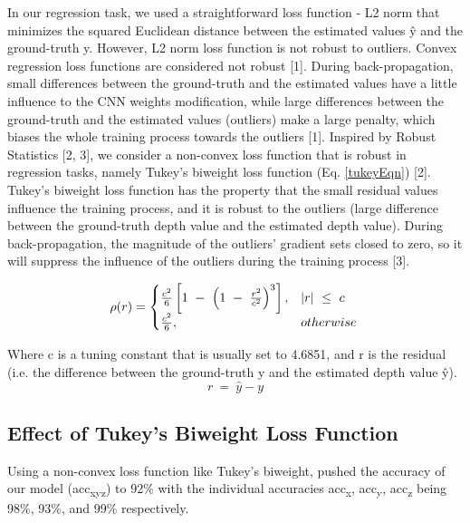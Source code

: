 \documentclass{article}
\begin{document}
In our regression task, we used a straightforward loss function - L2 norm that minimizes the squared Euclidean distance
between the estimated values ŷ and the ground-truth y. However, L2 norm loss function is not robust to outliers. Convex regression loss functions are considered not robust [1]. During back-propagation, small differences between the ground-truth and the estimated values have a little influence to the CNN weights modification, while large differences between the ground-truth and the estimated values (outliers) make a large penalty, which biases the whole training process towards the outliers [1]. Inspired by Robust Statistics [2, 3], we consider a non-convex loss function that is robust in regression tasks, namely Tukey's biweight loss function (Eq. \ref{tukeyEqn}) [2]. Tukey's biweight loss function has the property that the small residual values influence the training process, and it is robust to the outliers (large difference between the ground-truth depth value and the estimated depth value). During back-propagation, the magnitude of the outliers’ gradient sets closed to zero, so it will suppress the influence of the outliers during the training process [3].

\begin{equation}
\label{tukeyEqn}
\rho(r)=
\begin{cases}
\frac{c^2}{6}\left[1\ -\ \left(1\ -\ \frac{r^2}{c^2}\right)^3 \right],  & \left|r\right|\ \le\ c \\
\frac{c^2}{6}, & otherwise \\
\end{cases}\\
\end{equation}

Where c is a tuning constant that is usually set to 4.6851, and r is the residual (i.e. the difference between the ground-truth y and the estimated depth value ŷ).
\begin{equation}
r\ = \ \hat{y} - y
\end{equation}

\subsection{Effect of Tukey's Biweight Loss Function}
Using a non-convex loss function like Tukey's biweight, pushed the accuracy of our model (acc\textsubscript{xyz}) to 92\% with the individual accuracies acc\textsubscript{x}, acc\textsubscript{y}, acc\textsubscript{z} being 98\%, 93\%, and 99\% respectively.
\end{document}
